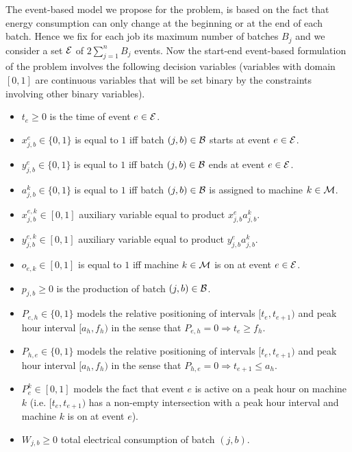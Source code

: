 The event-based model we propose for the problem, is based on the fact
that energy consumption can only change at the beginning or at the end
of each batch. Hence we fix for each job its maximum number of batches
$B_j$ and we consider a set ${\cal E}$ of $2\sum_{j=1}^nB_j$
events. Now the start-end event-based formulation of the problem
involves the following decision variables (variables with domain
$[0,1]$ are continuous variables that will be set binary by the
constraints involving other binary variables).

\begin{itemize}
\item $t_e\geq 0$ is the time of event $e\in{\cal E}$.
\item $x_{j,b}^e\in\{0,1\}$ is equal to $1$ iff batch $(j,b)\in{\cal
  B}$ starts at event $e\in{\cal E}$.
\item $y_{j,b}^e\in\{0,1\}$ is equal to $1$ iff batch $(j,b)\in{\cal
  B}$ ends at event $e\in{\cal E}$.
\item $a_{j,b}^k\in\{0,1\}$ is equal to $1$ iff batch $(j,b)\in{\cal
  B}$ is assigned to machine $k\in{\cal M}$.
\item $x_{j,b}^{e,k}\in[0,1]$ auxiliary variable equal to product
  $x_{j,b}^ea_{j,b}^k$.
\item $y_{j,b}^{e,k}\in[0,1]$ auxiliary variable equal to product
  $y_{j,b}^ea_{j,b}^k$.
\item $o_{e,k}\in[0,1]$ is equal to $1$ iff machine $k\in{\cal M}$ is
  on at event $e\in{\cal E}$.
\item $p_{j,b}\geq 0$ is the production of batch $(j,b)\in{\cal B}$.
\item $P_{e,h}\in\{0,1\}$ models the relative positioning of
  intervals $[t_e,t_{e+1})$ and peak hour interval $[a_h,f_h)$ in the
      sense that $P_{e,h}=0\Rightarrow t_e\geq f_h$.
\item $P_{h,e}\in\{0,1\}$ models the relative positioning of
  intervals $[t_e,t_{e+1})$ and peak hour interval $[a_h,f_h)$ in the
      sense that $P_{h,e}=0\Rightarrow t_{e+1}\leq a_h$.
\item $P_e^k\in[0,1]$ models the fact that event $e$ is active on a peak hour on machine
  $k$ (i.e. $[t_e,t_{e+1})$ has a non-empty intersection with a peak
  hour interval and machine $k$ is on at event $e$).
\item $W_{j,b}\geq 0$ total electrical consumption of batch $(j,b)$.
\end{itemize}


